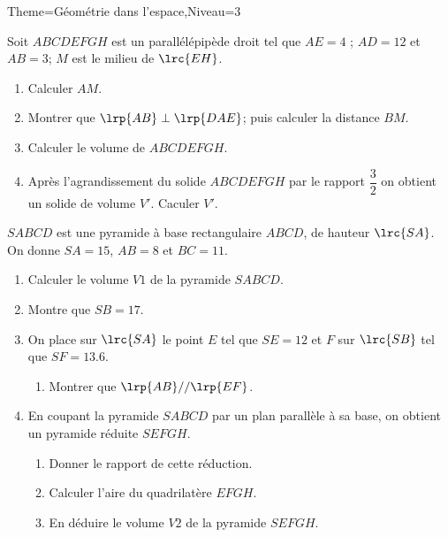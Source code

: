 \documentclass[a4paper,12pt]{article}
\begin{document}
\begin{Maquette}[Fiche]{Theme=Géométrie dans l'espace,Niveau=3}
\begin{exercice}
Soit $ABCDEFGH$ est un parallélépipède droit tel que $AE=4$ ; $AD=12$ et $AB=3$; $M$ est le milieu de $\lrc{EH}$.
\begin{enumerate}
\item Calculer $AM$.
\item Montrer que $\lrp{AB}\perp\lrp{DAE}$; puis calculer la distance $BM$.
\item Calculer le volume de $ABCDEFGH$.
\item Après l'agrandissement du solide $ABCDEFGH$ par le rapport $\dfrac{3}{2}$ on obtient un solide de volume $V'$. Caculer $V'$.
\end{enumerate}
\end{exercice}

\begin{exercice}
\begin{minipage}{0.6\linewidth}
$SABCD$ est une pyramide à base rectangulaire $ABCD$, de hauteur $\lrc{SA}$. On donne $SA=15$, $AB=8$ et $BC=11$.
\begin{enumerate}
\item Calculer le volume $V1$ de la pyramide $SABCD$.
\item Montre que $SB=17$.
\item On place sur $\lrc{SA}$ le point $E$ tel que $SE=12$ et $F$ sur $\lrc{SB}$ tel que $SF=13.6$.
\begin{enumerate}
\item Montrer que $\lrp{AB}//\lrp{EF}$.
\end{enumerate}
\item En coupant la pyramide $SABCD$ par un plan parallèle à sa base, on obtient un pyramide réduite $SEFGH$.
\begin{enumerate}
\item Donner le rapport de cette réduction.
\item Calculer l'aire du quadrilatère $EFGH$.
\item En déduire le volume $V2$ de la pyramide $SEFGH$.
\end{enumerate}
\end{enumerate}
\end{minipage}%
\begin{minipage}{0.4\linewidth}
\end{minipage}
\end{exercice}


\end{Maquette}
\end{document}
